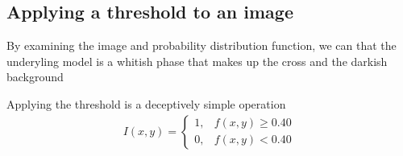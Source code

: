 \documentclass[letterpaper,10pt,english]{sphinxmanual}
\begin{document}
\noindent{}


\subsection{Applying a threshold to an image}
\label{\detokenize{ML4NeutronImageSegmentation:applying-a-threshold-to-an-image}}
By examining the image and probability distribution function, we can  that the underyling model is a whitish phase that makes up the cross and the darkish background

Applying the threshold is a deceptively simple operation
\begin{equation*}
\begin{split} I(x,y) = 
\begin{cases}
1, & f(x,y)\geq0.40 \\
0, & f(x,y)<0.40
\end{cases}\end{split}
\end{equation*}
\end{document}
